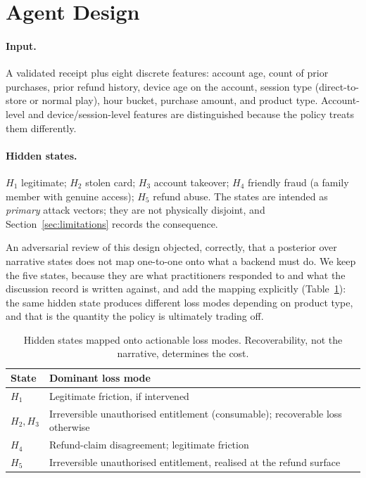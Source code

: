 \documentclass{article}
\begin{document}
\section{Agent Design}
\label{sec:design}

\paragraph{Input.} A validated receipt plus eight discrete features: account age, count of
prior purchases, prior refund history, device age on the account, session type
(direct-to-store or normal play), hour bucket, purchase amount, and product type.
Account-level and device/session-level features are distinguished because the policy treats
them differently.

\paragraph{Hidden states.} $H_1$ legitimate; $H_2$ stolen card; $H_3$ account takeover;
$H_4$ friendly fraud (a family member with genuine access); $H_5$ refund abuse. The states
are intended as \emph{primary} attack vectors; they are not physically disjoint, and
Section~\ref{sec:limitations} records the consequence.

An adversarial review of this design objected, correctly, that a posterior over narrative
states does not map one-to-one onto what a backend must do. We keep the five states,
because they are what practitioners responded to and what the discussion record is written
against, and add the mapping explicitly (Table~\ref{tab:lossmodes}): the same hidden state
produces different loss modes depending on product type, and that is the quantity the
policy is ultimately trading off.

\begin{table}[t]
\centering
\small
\begin{tabular}{lp{4.1cm}}
\toprule
\textbf{State} & \textbf{Dominant loss mode} \\
\midrule
$H_1$ & Legitimate friction, if intervened \\
$H_2, H_3$ & Irreversible unauthorised entitlement (consumable); recoverable loss otherwise \\
$H_4$ & Refund-claim disagreement; legitimate friction \\
$H_5$ & Irreversible unauthorised entitlement, realised at the refund surface \\
\bottomrule
\end{tabular}
\caption{Hidden states mapped onto actionable loss modes. Recoverability, not the
narrative, determines the cost.}
\label{tab:lossmodes}
\end{table}
\end{document}
